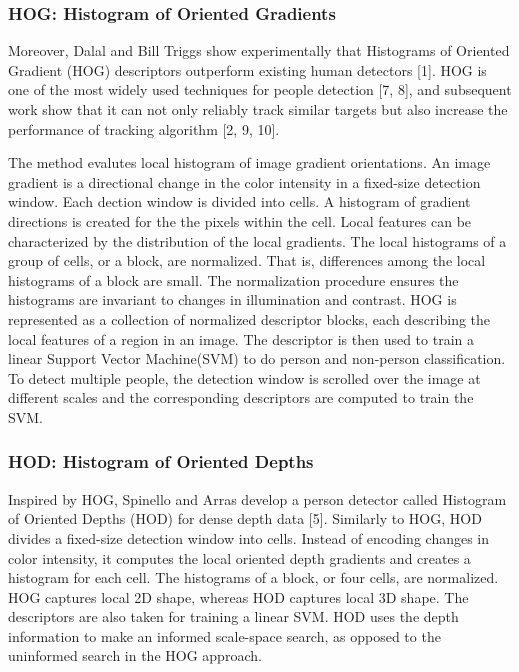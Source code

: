\documentclass[paper=a4, fontsize=11pt]{scrartcl}
\numberwithin{equation}{section}		%
\numberwithin{figure}{section}			%
\numberwithin{table}{section}				%
\begin{document}
\subsubsection{HOG: Histogram of Oriented Gradients}

Moreover, Dalal and Bill Triggs show experimentally that Histograms of Oriented Gradient (HOG) descriptors outperform existing human detectors [1]. HOG is one of the most widely used techniques for people detection [7, 8], and subsequent work show that it can not only reliably track similar targets but also increase the performance of tracking algorithm [2, 9, 10].

The method evalutes local histogram of image gradient orientations. An image gradient is a directional change in the color intensity in a fixed-size detection window. Each dection window is divided into cells. A histogram of gradient directions is created for the the pixels within the cell. Local features can be characterized by the distribution of the local gradients. The local histograms of a group of cells, or a block, are normalized. That is, differences among the local histograms of a block are small. The normalization procedure ensures the histograms are invariant to changes in illumination and contrast. HOG is represented as a collection of normalized descriptor blocks, each describing the local features of a region in an image. The descriptor is then used to train a linear Support Vector Machine(SVM) to do person and non-person classification. To detect multiple people, the detection window is scrolled over the image at different scales and the corresponding descriptors are computed to train the SVM.

\subsubsection{HOD: Histogram of Oriented Depths}

Inspired by HOG, Spinello and Arras develop a person detector called Histogram of Oriented Depths (HOD) for dense depth data [5]. Similarly to HOG, HOD divides a fixed-size detection window into cells. Instead of encoding changes in color intensity, it computes the local oriented depth gradients and creates a histogram for each cell. The histograms of a block, or four cells, are normalized. HOG captures local 2D shape, whereas HOD captures local 3D shape. The descriptors are also taken for training a linear SVM. HOD uses the depth information to make an informed scale-space search, as opposed to the uninformed search in the HOG approach.
\end{document}
